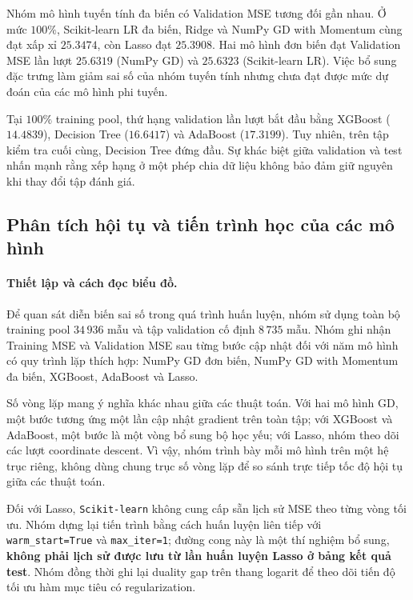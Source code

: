 Nhóm mô hình tuyến tính đa biến có Validation MSE tương đối gần
nhau. Ở mức $100\%$, Scikit-learn LR đa biến, Ridge và
NumPy GD with Momentum cùng đạt xấp xỉ $25.3474$,
còn Lasso đạt $25.3908$. Hai mô hình đơn biến đạt
Validation MSE lần lượt $25.6319$ (NumPy GD) và $25.6323$
(Scikit-learn LR). Việc bổ sung đặc trưng làm giảm sai số
của nhóm tuyến tính nhưng chưa đạt được mức dự đoán của
các mô hình phi tuyến.

Tại $100\%$ training pool, thứ hạng validation lần lượt
bắt đầu bằng XGBoost ($14.4839$), Decision Tree ($16.6417$)
và AdaBoost ($17.3199$). Tuy nhiên, trên tập kiểm tra cuối
cùng, Decision Tree đứng đầu. Sự khác biệt giữa validation
và test nhấn mạnh rằng xếp hạng ở một phép chia dữ liệu
không bảo đảm giữ nguyên khi thay đổi tập đánh giá.


\subsection{Phân tích hội tụ và tiến trình học của các mô hình}
\label{subsec:iterative-convergence}

\paragraph{Thiết lập và cách đọc biểu đồ.}

Để quan sát diễn biến sai số trong quá trình huấn luyện, nhóm
sử dụng toàn bộ training pool $34\,936$ mẫu và tập validation
cố định $8\,735$ mẫu. Nhóm ghi nhận Training MSE và Validation
MSE sau từng bước cập nhật đối với năm mô hình có quy trình
lặp thích hợp: NumPy GD đơn biến, NumPy GD with Momentum đa biến,
XGBoost, AdaBoost và Lasso.

Số vòng lặp mang ý nghĩa khác nhau giữa các thuật toán.
Với hai mô hình GD, một bước tương ứng một lần cập nhật gradient
trên toàn tập; với XGBoost và AdaBoost, một bước là một vòng
bổ sung bộ học yếu; với Lasso, nhóm theo dõi các lượt
coordinate descent. Vì vậy, nhóm trình bày mỗi mô hình trên
một hệ trục riêng, không dùng chung trục số vòng lặp để so sánh
trực tiếp tốc độ hội tụ giữa các thuật toán.

Đối với Lasso, \texttt{Scikit-learn} không cung cấp sẵn lịch sử
MSE theo từng vòng tối ưu. Nhóm dựng lại tiến trình bằng cách
huấn luyện liên tiếp với \texttt{warm\_start=True} và
\texttt{max\_iter=1}; đường cong này là một thí nghiệm
bổ sung, \textbf{không phải lịch sử được lưu từ lần huấn luyện
Lasso ở bảng kết quả test}. Nhóm đồng thời ghi lại duality gap
trên thang logarit để theo dõi tiến độ tối ưu hàm mục tiêu
có regularization.

